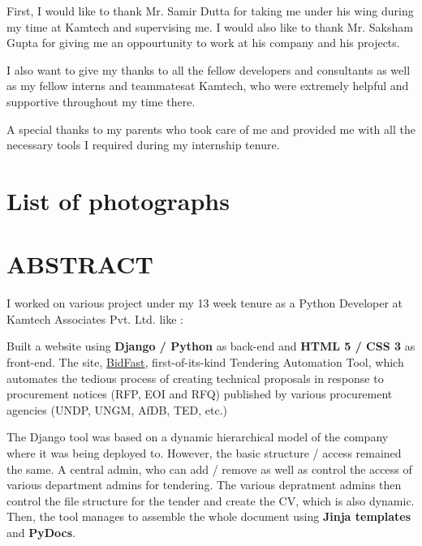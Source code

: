 \documentclass[14pt]{extarticle}
\begin{document}
\par First, I would like to thank Mr. Samir Dutta for taking me under his wing during my time at Kamtech and supervising me. I would also like to thank Mr. Saksham Gupta for giving me an oppourtunity to work at his company and his projects.

\par I also want to give my thanks to all the fellow developers and consultants as well as my fellow interns and teammatesat Kamtech, who were extremely helpful and supportive throughout my time there.

\par A special thanks to my parents who took care of me and provided me with all the necessary tools I required during my internship tenure.

\newpage
{}
\listoffigures

\newpage
{}
\listoftables

\newpage
{}
\section*{List of photographs}

\newpage
{}
\section*{ABSTRACT}
\onehalfspacing

I worked on various project under my 13 week tenure as a Python Developer at Kamtech Associates Pvt. Ltd. like : 

Built a website using \textbf{Django / Python} as back-end and \textbf{HTML 5 / CSS 3} as front-end. The site, \href{https://edubild.com/bidfast/}{BidFast}, first-of-its-kind Tendering Automation Tool, which automates the tedious process of creating technical proposals in response to procurement notices (RFP, EOI and RFQ) published by various procurement agencies (UNDP, UNGM, AfDB, TED, etc.)

The Django tool was based on a dynamic hierarchical model of the company where it was being deployed to. However, the basic structure / access remained the same. A central admin, who can add / remove as well as control the access of various department admins for tendering. The various depratment admins then control the file structure for the tender and create the CV, which is also dynamic. Then, the tool manages to assemble the whole document using \textbf{Jinja templates} and \textbf{PyDocs}.
\end{document}
